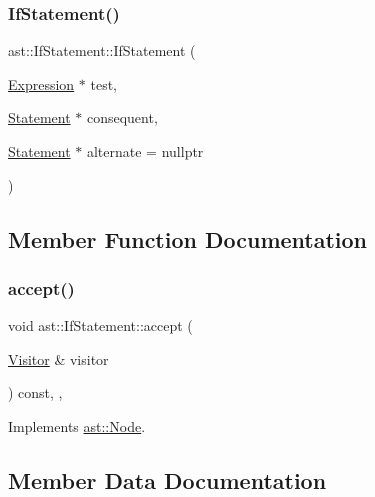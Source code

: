\subsubsection{\texorpdfstring{If\+Statement()}{IfStatement()}}
{\footnotesize\ttfamily ast\+::\+If\+Statement\+::\+If\+Statement (\begin{DoxyParamCaption}\item[{\hyperlink{structast_1_1_expression}{Expression} $\ast$}]{test,  }\item[{\hyperlink{structast_1_1_statement}{Statement} $\ast$}]{consequent,  }\item[{\hyperlink{structast_1_1_statement}{Statement} $\ast$}]{alternate = {\ttfamily nullptr} }\end{DoxyParamCaption})\hspace{0.3cm}{\ttfamily [inline]}}



\subsection{Member Function Documentation}
\mbox{\label{structast_1_1_if_statement_ab4053b9564cf00687f8f1351dd8044cb}} 
\subsubsection{\texorpdfstring{accept()}{accept()}}
{\footnotesize\ttfamily void ast\+::\+If\+Statement\+::accept (\begin{DoxyParamCaption}\item[{\hyperlink{structast_1_1_visitor}{Visitor} \&}]{visitor }\end{DoxyParamCaption}) const\hspace{0.3cm}{\ttfamily [inline]}, {\ttfamily [override]}, {\ttfamily [virtual]}}



Implements \hyperlink{structast_1_1_node_abc089ee6caaf06a4445ebdd8391fdebc}{ast\+::\+Node}.



\subsection{Member Data Documentation}
\mbox{\label{structast_1_1_if_statement_a2f84078dbbe4d3246609c13c526fc69d}} 
